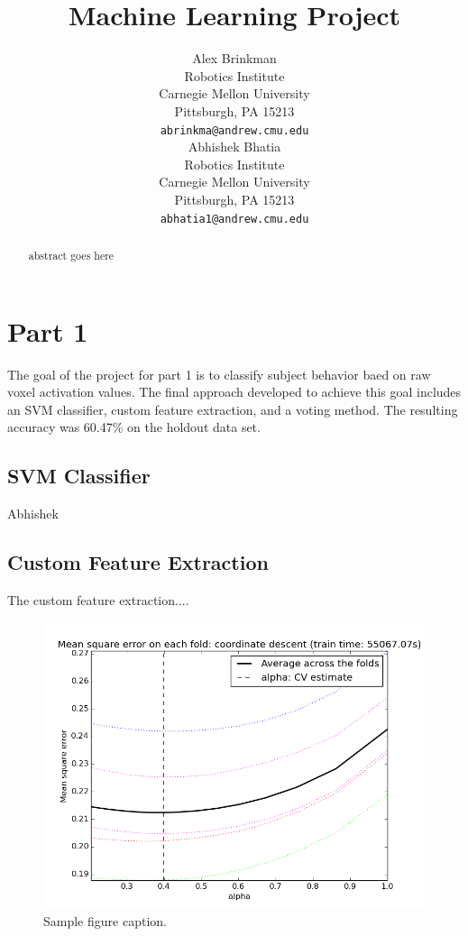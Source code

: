 \documentclass{article} %
\title{Machine Learning Project}
\author{
Alex Brinkman\\
Robotics Institute\\
Carnegie Mellon University\\
Pittsburgh, PA 15213 \\
\texttt{abrinkma@andrew.cmu.edu} \\
\And
Abhishek Bhatia \\
Robotics Institute \\
Carnegie Mellon University\\
Pittsburgh, PA 15213 \\
\texttt{abhatia1@andrew.cmu.edu} \\
}
\begin{document}
\maketitle

\begin{abstract}
abstract goes here
\end{abstract}

\section{Part 1}

The goal of the project for part 1 is to classify subject behavior baed on raw voxel activation values.  The final approach developed to achieve this goal includes an SVM classifier, custom feature extraction, and a voting method. The resulting accuracy was 60.47\% on the holdout data set.
\subsection{SVM Classifier}
Abhishek
\subsection{Custom Feature Extraction}

The custom feature extraction....

\begin{figure}[h]
\begin{center}
\includegraphics[scale=.5]{media/cross_validation_figure_2.png}
\end{center}
\caption{Sample figure caption.}
\end{figure}
\end{document}
